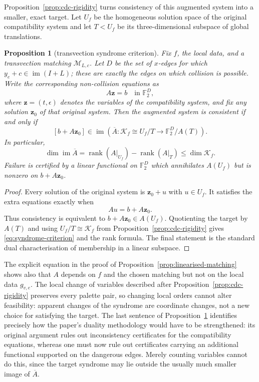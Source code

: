 \documentclass[11pt,a4paper]{article}
\newtheorem{proposition}[theorem]{Proposition}
\theoremstyle{definition}
\theoremstyle{remark}
\begin{document}
Proposition~\ref{prop:cdc-rigidity} turns consistency of this augmented system into a smaller, exact target.  Let $U_f$ be the homogeneous solution space of the original compatibility system and let $T<U_f$ be its three-dimensional subspace of global translations.

\begin{proposition}[transvection syndrome criterion]\label{prop:transvection-syndrome}
Fix $f$, the local data, and a transvection matching $\mathcal M_{L,c}$.  Let $D$ be the set of $x$-edges for which $y_e+c\in\operatorname{im}(I+L)$; these are exactly the edges on which collision is possible.  Write the corresponding non-collision equations as
\[
 A\mathbf z=b\quad\text{in }\mathbb F_2^D,
\]
where $\mathbf z=(t,\epsilon)$ denotes the variables of the compatibility system, and fix any solution $\mathbf z_0$ of that original system.  Then the augmented system is consistent if and only if
\begin{equation}\label{eq:syndrome-criterion}
 [b+A\mathbf z_0]\in
 \operatorname{im}\left(
  \overline A:\mathcal K_f\cong U_f/T
  \longrightarrow \mathbb F_2^D/A(T)
 \right).
\end{equation}
In particular,
\[
 \dim\operatorname{im}\overline A
 =\operatorname{rank}(A|_{U_f})-\operatorname{rank}(A|_T)
 \le \dim\mathcal K_f.
\]
Failure is certified by a linear functional on $\mathbb F_2^D$ which annihilates $A(U_f)$ but is nonzero on $b+A\mathbf z_0$.
\end{proposition}
\begin{proof}
Every solution of the original system is $\mathbf z_0+u$ with $u\in U_f$.  It satisfies the extra equations exactly when
\[
 Au=b+A\mathbf z_0.
\]
Thus consistency is equivalent to $b+A\mathbf z_0\in A(U_f)$.  Quotienting the target by $A(T)$ and using $U_f/T\cong\mathcal K_f$ from Proposition~\ref{prop:cdc-rigidity} gives \eqref{eq:syndrome-criterion} and the rank formula.  The final statement is the standard dual characterisation of membership in a linear subspace.
\end{proof}

The explicit equation in the proof of Proposition~\ref{prop:linearised-matching} shows also that $A$ depends on $f$ and the chosen matching but not on the local data $g_{v,e}$.  The local change of variables described after Proposition~\ref{prop:cdc-rigidity} preserves every palette pair, so changing local orders cannot alter feasibility: apparent changes of the syndrome are coordinate changes, not a new choice for satisfying the target.  The last sentence of Proposition~\ref{prop:transvection-syndrome} identifies precisely how the paper's duality methodology would have to be strengthened: its original argument rules out inconsistency certificates for the compatibility equations, whereas one must now rule out certificates carrying an additional functional supported on the dangerous edges.  Merely counting variables cannot do this, since the target syndrome may lie outside the usually much smaller image of $\overline A$.
\end{document}

